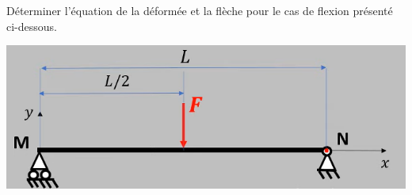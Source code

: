 \documentclass[lecture.tex]{subfiles}
\begin{document}
\exercice{}

Déterminer l'équation de la déformée et la flèche pour le cas de flexion présenté ci-dessous.

\begin{center}
  \includegraphics[scale=0.5]{figA0036.png}
\end{center}

\finexercice
\end{document}
